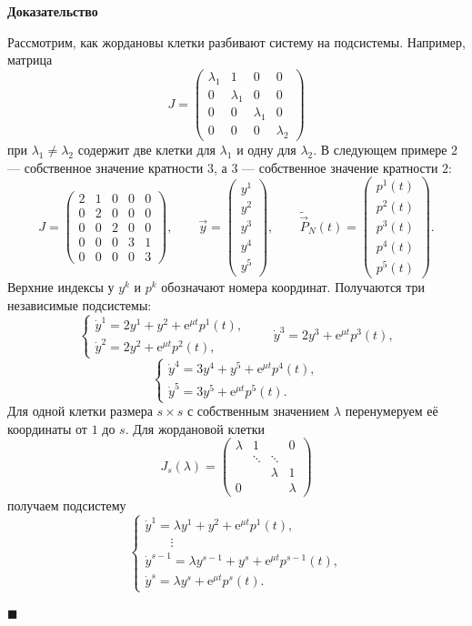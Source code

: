 \documentclass[12pt,a4paper]{article}
\numberwithin{equation}{section}
\newcommand{\vect}[1]{\vec{#1}}
\newcommand{\e}{\mathrm{e}}
\renewenvironment{proof}[1][Доказательство]{\begin{center}\textbf{#1}\end{center}}{\hfill$\blacksquare$\par}
\begin{document}
\begin{proof}
Рассмотрим, как жордановы клетки разбивают систему на подсистемы.
Например, матрица
\[
 J=\begin{pmatrix}
 \lambda_1&1&0&0\\
 0&\lambda_1&0&0\\
 0&0&\lambda_1&0\\
 0&0&0&\lambda_2
 \end{pmatrix}
\]
при $\lambda_1\ne\lambda_2$ содержит две клетки для $\lambda_1$ и одну для $\lambda_2$.
В следующем примере $2$ --- собственное значение кратности $3$,
а $3$ --- собственное значение кратности $2$:
\[
 J=\begin{pmatrix}
 2&1&0&0&0\\
 0&2&0&0&0\\
 0&0&2&0&0\\
 0&0&0&3&1\\
 0&0&0&0&3
 \end{pmatrix},\qquad
 \vect y=\begin{pmatrix}y^1\\ y^2\\ y^3\\ y^4\\ y^5\end{pmatrix},\qquad
 \widetilde{\vect P}_N(t)=
 \begin{pmatrix}p^1(t)\\ p^2(t)\\ p^3(t)\\ p^4(t)\\ p^5(t)\end{pmatrix}.
\]
Верхние индексы у $y^k$ и $p^k$ обозначают номера координат. Получаются три независимые подсистемы:
\[
 \begin{cases}
 \dot y^1=2y^1+y^2+\e^{\mu t}p^1(t),\\
 \dot y^2=2y^2+\e^{\mu t}p^2(t),
 \end{cases}
 \qquad
 \dot y^3=2y^3+\e^{\mu t}p^3(t),
\]
\[
 \begin{cases}
 \dot y^4=3y^4+y^5+\e^{\mu t}p^4(t),\\
 \dot y^5=3y^5+\e^{\mu t}p^5(t).
 \end{cases}
\]
Для одной клетки размера $s\times s$ с собственным значением $\lambda$
перенумеруем её координаты от $1$ до $s$. Для жордановой клетки
\[
 J_s(\lambda)=
 \begin{pmatrix}
 \lambda&1&&0\\
 &\ddots&\ddots&\\
 &&\lambda&1\\
 0&&&\lambda
 \end{pmatrix}
\]
получаем подсистему
\[
 \begin{cases}
 \dot y^1=\lambda y^1+y^2+\e^{\mu t}p^1(t),\\
 \hspace{2em}\vdots\\
 \dot y^{s-1}=\lambda y^{s-1}+y^s+\e^{\mu t}p^{s-1}(t),\\
 \dot y^s=\lambda y^s+\e^{\mu t}p^s(t).
 \end{cases}
\]


\end{proof}
\end{document}
